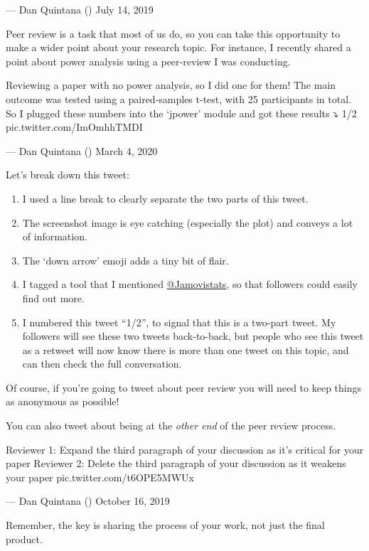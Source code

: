 \documentclass[]{book}
\providecommand{\tightlist}{%
  \setlength{\itemsep}{0pt}\setlength{\parskip}{0pt}}
\begin{document}
--- Dan Quintana (\citet{dsquintana}) July 14, 2019

Peer review is a task that most of us do, so you can take this opportunity to make a wider point about your research topic. For instance, I recently shared a point about power analysis using a peer-review I was conducting.

Reviewing a paper with no power analysis, so I did one for them! The main outcome was tested using a paired-samples t-test, with 25 participants in total. So I plugged these numbers into the \citet{jamovistats} `jpower' module and got these results ⤵️ 1/2 pic.twitter.com/ImOmhhTMDI

--- Dan Quintana (\citet{dsquintana}) March 4, 2020

Let's break down this tweet:

\begin{enumerate}
\def\labelenumi{\arabic{enumi}.}
\tightlist
\item
  I used a line break to clearly separate the two parts of this tweet.
\item
  The screenshot image is eye catching (especially the plot) and conveys a lot of information.
\item
  The `down arrow' emoji adds a tiny bit of flair.
\item
  I tagged a tool that I mentioned \href{https://twitter.com/Jamovistats}{@Jamovistats}, so that followers could easily find out more.
\item
  I numbered this tweet ``1/2'', to signal that this is a two-part tweet. My followers will see these two tweets back-to-back, but people who see this tweet as a retweet will now know there is more than one tweet on this topic, and can then check the full conversation.
\end{enumerate}

Of course, if you're going to tweet about peer review you will need to keep things as anonymous as possible!

You can also tweet about being at the \emph{other end} of the peer review process.

Reviewer 1: Expand the third paragraph of your discussion as it's critical for your paper Reviewer 2: Delete the third paragraph of your discussion as it weakens your paper pic.twitter.com/t6OPE5MWUx

--- Dan Quintana (\citet{dsquintana}) October 16, 2019

Remember, the key is sharing the process of your work, not just the final product.
\end{document}
